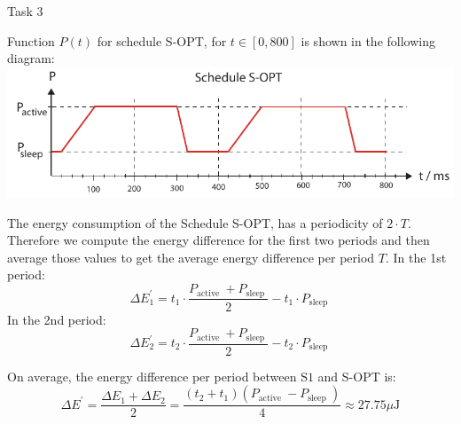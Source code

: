 \begin{frame}[allowframebreaks]{Task 3}{}
  \begin{solutionnoinc}
    Function $P(t)$ for schedule S-OPT, for $t \in[0,800]$ is shown in the following diagram:
    \includegraphics[width=\textwidth]{./figures/task3_3.png}
  \end{solutionnoinc}
  \begin{solutionnoinc}
    The energy consumption of the Schedule S-OPT, has a periodicity of $2 \cdot T$. Therefore we compute the energy difference for the first two periods and then average those values to get the average energy difference per period $T$. In the 1st period:
    \[
    \Delta E_1^{\prime}=t_1 \cdot \frac{P_{\text {active }}+P_{\text {sleep }}}{2}-t_1 \cdot P_{\text {sleep }}
    \]
    In the 2nd period:
    \[
    \Delta E_2^{\prime}=t_2 \cdot \frac{P_{\text {active }}+P_{\text {sleep }}}{2}-t_2 \cdot P_{\text {sleep }}
    \]
  \end{solutionnoinc}
  \begin{solution}
    On average, the energy difference per period between $\mathrm{S} 1$ and S-OPT is:
    \[
    \Delta E^{\prime}=\frac{\Delta E_1+\Delta E_2}{2}=\frac{\left(t_2+t_1\right)\left(P_{\text {active }}-P_{\text {sleep }}\right)}{4} \approx 27.75 \mu \mathrm{J}
    \]
  \end{solution}
\end{frame}
